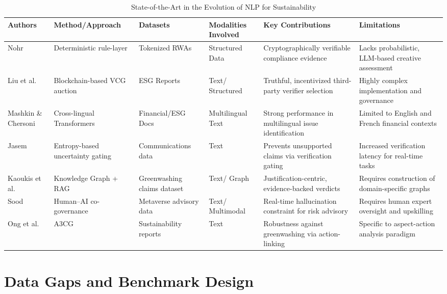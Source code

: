 \begin{landscape}
\begin{table}[p]
\centering
\caption{State-of-the-Art in the Evolution of NLP for Sustainability}
\label{tab:evolution-of-nlp-for-sustainability}
\small
\renewcommand{\arraystretch}{1.2}
\begin{tabularx}{\linewidth}{|p{1.8cm}|X|X|p{1.8cm}|X|X|}
\hline
Authors & Method/Approach & Datasets & Modalities Involved & Key Contributions & Limitations \\ \hline
Nohr  \parencite{steven_paul_nohr_a6874924} & Deterministic rule-layer & Tokenized RWAs & Structured Data & Cryptographically verifiable compliance evidence & Lacks probabilistic, LLM-based creative assessment \\ \hline
Liu et al.  \parencite{liyuan_liu_91c36432} & Blockchain-based VCG auction & ESG Reports & Text/ Structured & Truthful, incentivized third-party verifier selection & Highly complex implementation and governance \\ \hline
Mashkin \& Chersoni  \parencite{ivan_mashkin_fba24085} & Cross-lingual Transformers & Financial/ESG Docs & Multilingual Text & Strong performance in multilingual issue identification & Limited to English and French financial contexts \\ \hline
Jasem  \parencite{al_noor_ali_aziz_jasem_af362154} & Entropy-based uncertainty gating & Communications data & Text & Prevents unsupported claims via verification gating & Increased verification latency for real-time tasks \\ \hline
Kaoukis et al.  \parencite{kaoukis__georgios_35bab107} & Knowledge Graph + RAG & Greenwashing claims dataset & Text/ Graph & Justification-centric, evidence-backed verdicts & Requires construction of domain-specific graphs \\ \hline
Sood  \parencite{rohit_sood_cb3a4ead} & Human–AI co-governance & Metaverse advisory data & Text/ Multimodal & Real-time hallucination constraint for risk advisory & Requires human expert oversight and upskilling \\ \hline
Ong et al.  \parencite{keane_ong_0a5de439} & A3CG & Sustainability reports & Text & Robustness against greenwashing via action-linking & Specific to aspect-action analysis paradigm \\ \hline
\end{tabularx}
\end{table}
\end{landscape}


\section{Data Gaps and Benchmark Design}

